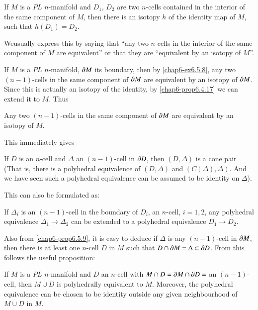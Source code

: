 \begin{excoro}\label{chap6-ex6.5.8}
If $M$ is a $PL$ $n$-manifold and $D_{1}$, $D_{2}$ are two $n$-cells contained in the interior of the same component of $M$, then there is an isotopy $h$ of the identity map of $M$, such that $h(D_{1})=D_{2}$.
\end{excoro}

We\pageoriginale usually express this by saying that ``any two $n$-cells in the interior of the same component of $M$ are equivalent'' or that they are ``equivalent by an isotopy of $M$''.

If $M$ is a $PL$ $n$-manifold, $\partial M$ its boundary, then by \ref{chap6-ex6.5.8}, any two $(n-1)$-cells in the same component of $\partial M$ are equivalent by an isotopy of $\partial M$. Since this is actually an isotopy of the identity, by \ref{chap6-prop6.4.17} we can extend it to $M$. Thus

\begin{proposition}\label{chap6-prop6.5.9}
Any two $(n-1)$-cells in the same component of $\partial M$ are equivalent by an isotopy of $M$.
\end{proposition}

This immediately gives

\begin{ex}\label{chap6-ex6.5.10}
If $D$ is an $n$-cell and $\Delta$ an $(n-1)$-cell in $\partial D$, then $(D,\Delta)$ is a cone pair (That is, there is a polyhedral equivalence of $(D,\Delta)$ and $(C(\Delta),\Delta)$. And we have seen such a polyhedral equivalence can be assumed to be identity on $\Delta$).
\end{ex}

This can also be formulated as:

\medskip
{}
If $\Delta_{i}$ is an $(n-1)$-cell in the boundary of $D_{i}$, an $n$-cell, $i=1,2$, any polyhedral equivalence $\Delta_{1}\to \Delta_{2}$ can be extended to a polyhedral equivalence $D_{1}\to D_{2}$.

Also from \ref{chap6-prop6.5.9}, it is easy to deduce if $\Delta$ is any $(n-1)$-cell in $\partial M$, then there is at least one $n$-cell $D$ in $M$ such that $D\cap \partial M=\Delta \subset \partial D$. From this follows the useful proposition:

\begin{ex}\label{chap6-ex6.5.11}
If $M$ is a $PL$ $n$-manifold and $D$ an $n$-cell with $M\cap D=\partial M\cap \partial D=$ an $(n-1)$-cell, then $M\cup D$ is polyhedrally equivalent to $M$. Moreover, the polyhedral equivalence can be chosen to be identity outside any given neighbourhood of $M\cup D$ in $M$.
\end{ex}

